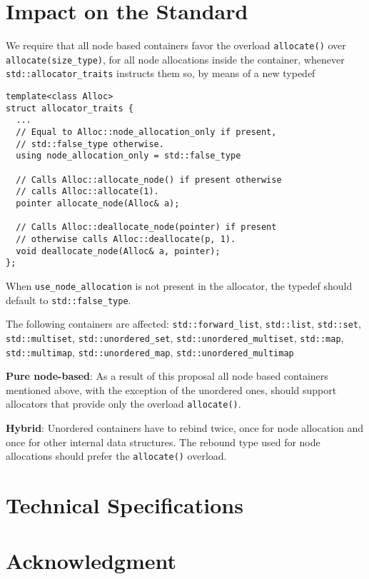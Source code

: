 \documentclass[11pt]{article}
\begin{document}
\section{Impact on the Standard} \label{impact}

We require that all node based containers favor the overload
\texttt{allocate()} over \texttt{allocate(size\_type)}, for all node
allocations inside the container, whenever
\texttt{std::allocator\_traits} instructs them so, by means of a new
typedef
\medskip
\begin{lstlisting}
template<class Alloc>
struct allocator_traits {
  ...
  // Equal to Alloc::node_allocation_only if present,
  // std::false_type otherwise.
  using node_allocation_only = std::false_type

  // Calls Alloc::allocate_node() if present otherwise
  // calls Alloc::allocate(1).
  pointer allocate_node(Alloc& a);

  // Calls Alloc::deallocate_node(pointer) if present
  // otherwise calls Alloc::deallocate(p, 1).
  void deallocate_node(Alloc& a, pointer);
};
\end{lstlisting}
When \texttt{use\_node\_allocation} is not present in the allocator,
the typedef should default to \texttt{std::false\_type}.

The following containers are affected: \texttt{std::forward\_list},
\texttt{std::list}, \texttt{std::set}, \texttt{std::multiset},
\texttt{std::unordered\_set}, \texttt{std::unordered\_multiset},
\texttt{std::map}, \texttt{std::multimap},
\texttt{std::unordered\_map}, \texttt{std::unordered\_multimap}

\medskip
\noindent
{\bf Pure node-based}: As a result of this proposal all node based
containers mentioned above, with the exception of the unordered ones,
should support allocators that provide only the overload
\texttt{allocate()}.

\medskip
\noindent
{\bf Hybrid}: Unordered containers have to rebind twice, once
for node allocation and once for other internal data structures.
The rebound type used for node allocations should prefer the 
\texttt{allocate()} overload.

\section{Technical Specifications}

\section{Acknowledgment}
\end{document}
